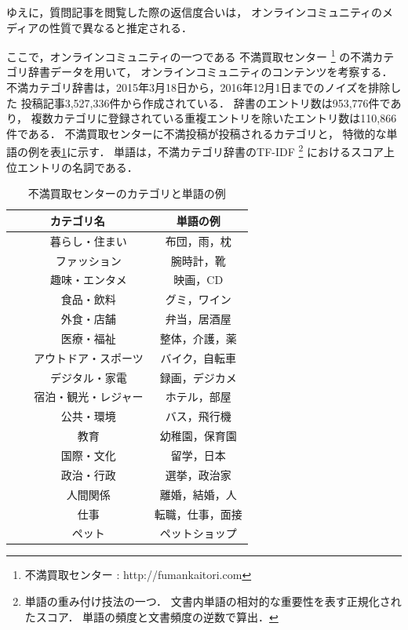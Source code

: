 \documentclass[12pt,a4paper,twocolumn,twoside]{jsik}
\begin{document}
\newpage
ゆえに，質問記事を閲覧した際の返信度合いは，
オンラインコミュニティのメディアの性質で異なると推定される．

ここで，オンラインコミュニティの一つである
不満買取センター
\footnote{
不満買取センター : http://fumankaitori.com
}
の不満カテゴリ辞書データを用いて，
オンラインコミュニティのコンテンツを考察する．
%
不満カテゴリ辞書は，2015年3月18日から，2016年12月1日までのノイズを排除した
投稿記事3,527,336件から作成されている\cite{insight_tech}．
辞書のエントリ数は953,776件であり，
複数カテゴリに登録されている重複エントリを除いたエントリ数は110,866件である．
%
不満買取センターに不満投稿が投稿されるカテゴリと，
特徴的な単語の例を表\ref{tab:insight_tec_dataset}に示す．
%
単語は，不満カテゴリ辞書のTF-IDF
\footnote{
単語の重み付け技法の一つ．
文書内単語の相対的な重要性を表す正規化されたスコア．
単語の頻度と文書頻度の逆数で算出．
}
におけるスコア上位エントリの名詞である．

\begin{table}[htb]
  \caption{不満買取センターのカテゴリと単語の例\cite{insight_tech}}
  \label{tab:insight_tec_dataset}
  \begin{center}
  \begin{tabular}{c|c} \hline
    カテゴリ名 & 単語の例 \\ \hline \hline
　　暮らし・住まい & 布団，雨，枕 \\ \hline
　　ファッション & 腕時計，靴 \\ \hline
　　趣味・エンタメ & 映画，CD \\ \hline
　　食品・飲料 & グミ，ワイン \\ \hline
　　外食・店舗 & 弁当，居酒屋 \\ \hline
　　医療・福祉 & 整体，介護，薬 \\ \hline
　　アウトドア・スポーツ & バイク，自転車 \\ \hline
　　デジタル・家電 & 録画，デジカメ \\ \hline
　　宿泊・観光・レジャー & ホテル，部屋 \\ \hline
　　公共・環境 & バス，飛行機 \\ \hline
　　教育 & 幼稚園，保育園 \\ \hline
　　国際・文化 & 留学，日本 \\ \hline
　　政治・行政 & 選挙，政治家 \\ \hline
　　人間関係 & 離婚，結婚，人 \\ \hline
　　仕事 &  転職，仕事，面接 \\ \hline
　　ペット &  ペットショップ \\ \hline
  \end{tabular}
  \end{center}
\end{table}
\end{document}
